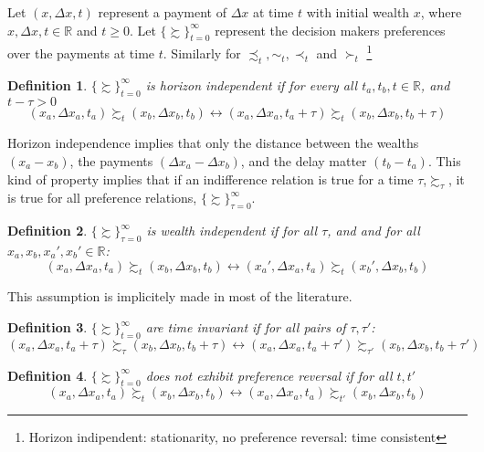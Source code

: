\documentclass[11pt]{article}
\newtheorem{definition}{Definition}
\numberwithin{equation}{section}
\begin{document}

Let $(x ,\Delta x,t)$ represent a payment of $\Delta x $ at time $t$ with initial wealth $x$, where $x, \Delta x, t \in \mathbb{R}$ and $t \geq 0$. Let $ \{ \succsim \}^{\infty}_{t=0}$ represent the decision makers preferences over the payments at time $t$. Similarly for $\precsim_t, \sim_t, \prec_t $ and $\succ_t$ \footnote{Horizon indipendent: stationarity, no preference reversal: time consistent}

\begin{definition}
$\{ \succsim \}^{\infty}_{t=0}$ is \textit{horizon independent} if for every all $t_a,t_b, t \in \mathbb{R}$, and $t - \tau > 0$ 
\begin{equation}
(x_a,\Delta x_a, t_a) \succsim_{t} (x_b,\Delta x_b, t_b) \leftrightarrow (x_a,\Delta x_a, t_a + \tau ) \succsim_t (x_b,\Delta x_b, t_b + \tau )
\end{equation}
\end{definition}

Horizon independence implies that only the distance between the wealths $(x_a-x_b)$, the payments $(\Delta x_a-\Delta x_b)$, and the delay matter $(t_b-t_a)$. This kind of property implies that if an indifference relation is true for a time $\tau$,$ \succsim_{\tau} $, it is true for all preference relations, $\{ \succsim \}^{\infty}_{\tau=0}$. 

\begin{definition}
$\{ \succsim \}^{\infty}_{\tau =0}$ is \textit{wealth independent} if for all $\tau$, and and for all $x_a,x_b,x_a',x_b'  \in \mathbb{R}$:
\begin{equation}
(x_a,\Delta x_a, t_a) \succsim_{t} (x_b,\Delta x_b, t_b) \leftrightarrow (x_a',\Delta x_a, t_a) \succsim_{t} (x_b',\Delta x_b, t_b)
\end{equation}
\end{definition}

This assumption is implicitely made in most of the literature. 

\begin{definition}
$\{ \succsim \}^{\infty}_{t=0}$ are time invariant if for all pairs of $\tau,\tau'$: 
\begin{equation}
(x_a,\Delta x_a, t_a+\tau) \succsim_{\tau} (x_b,\Delta x_b, t_b+ \tau) \leftrightarrow (x_a,\Delta x_a, t_a+\tau') \succsim_{\tau'} (x_b,\Delta x_b, t_b+\tau')
\end{equation}
\end{definition}

\begin{definition}
$\{ \succsim \}^{\infty}_{t=0}$ does not exhibit preference reversal if for all $t,t'$
\begin{equation}
(x_a,\Delta x_a, t_a) \succsim_t (x_b,\Delta x_b, t_b) \leftrightarrow (x_a,\Delta x_a, t_a) \succsim_{t'} (x_b,\Delta x_b, t_b)
\end{equation}
\end{definition}
\end{document}
